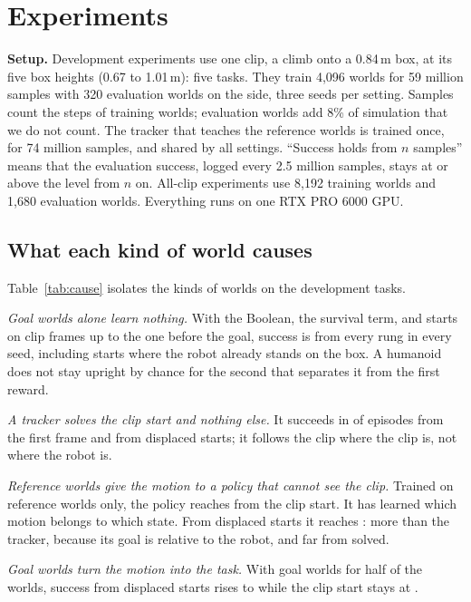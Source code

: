 \section{Experiments}
\label{sec:experiments}

\textbf{Setup.} Development experiments use one clip, a climb onto a 0.84\,m box, at its five box heights (0.67 to 1.01\,m): five tasks. They train 4{,}096 worlds for 59 million samples with 320 evaluation worlds on the side, three seeds per setting. Samples count the steps of training worlds; evaluation worlds add 8\% of simulation that we do not count. The tracker that teaches the reference worlds is trained once, for 74 million samples, and shared by all settings. ``Success holds from $n$ samples'' means that the evaluation success, logged every 2.5 million samples, stays at or above the level from $n$ on. All-clip experiments use 8{,}192 training worlds and 1{,}680 evaluation worlds. Everything runs on one RTX PRO 6000 GPU.

\subsection{What each kind of world causes}
\label{sec:cause}

Table~\ref{tab:cause} isolates the kinds of worlds on the development tasks.

\emph{Goal worlds alone learn nothing.} With the Boolean, the survival term, and starts on clip frames up to the one before the goal, success is \causeGoal{} from every rung in every seed, including starts where the robot already stands on the box. A humanoid does not stay upright by chance for the second that separates it from the first reward.

\emph{A tracker solves the clip start and nothing else.} It succeeds in \causeTrackerClip{} of episodes from the first frame and \causeTrackerAway{} from displaced starts; it follows the clip where the clip is, not where the robot is.

\emph{Reference worlds give the motion to a policy that cannot see the clip.} Trained on reference worlds only, the policy reaches \causeRefClip{} from the clip start. It has learned which motion belongs to which state. From displaced starts it reaches \causeRefAway{}: more than the tracker, because its goal is relative to the robot, and far from solved.

\emph{Goal worlds turn the motion into the task.} With goal worlds for half of the worlds, success from displaced starts rises to \causeHybridAway{} while the clip start stays at \causeHybridClip{}.

